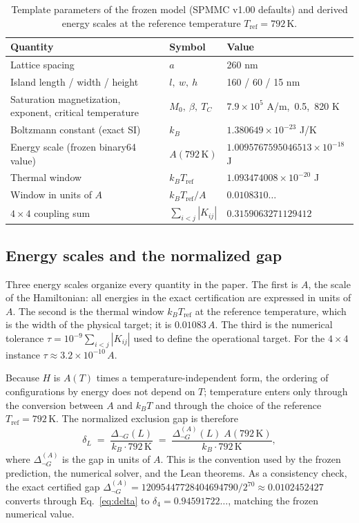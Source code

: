 \documentclass[11pt,a4paper]{article}
\theoremstyle{plain}
\theoremstyle{definition}
\theoremstyle{remark}
\newcommand{\dnG}{\Delta_{\neg G}}
\newcommand{\kBT}{k_{B}T}
\begin{document}
\begin{table}[t]
\centering\small
\caption{Template parameters of the frozen model (SPMMC v1.00 defaults) and derived energy scales at the reference temperature $T_{\mathrm{ref}}=792\,$K.}
\label{tab:params}
\begin{tabular}{@{}lll@{}}
\toprule
Quantity & Symbol & Value\\
\midrule
Lattice spacing & $a$ & 260 nm\\
Island length / width / height & $l,\ w,\ h$ & 160 / 60 / 15 nm\\
Saturation magnetization, exponent, critical temperature & $M_0,\ \beta,\ T_C$ & $7.9\times10^{5}$ A/m,\ 0.5,\ 820 K\\
Boltzmann constant (exact SI) & $k_B$ & $1.380649\times10^{-23}$ J/K\\
Energy scale (frozen binary64 value) & $A(792\,\mathrm K)$ & $1.0095767595046513\times10^{-18}$ J\\
Thermal window & $k_BT_{\mathrm{ref}}$ & $1.093474008\times10^{-20}$ J\\
Window in units of $A$ & $k_BT_{\mathrm{ref}}/A$ & $0.0108310\ldots$\\
$4\times4$ coupling sum & $\sum_{i<j}|K_{ij}|$ & $0.3159063271129412$\\
\bottomrule
\end{tabular}
\end{table}

\subsection{Energy scales and the normalized gap}
Three energy scales organize every quantity in the paper. The first is $A$, the scale of the Hamiltonian: all energies in the exact certification are expressed in units of $A$. The second is the thermal window $\kBT_{\mathrm{ref}}$ at the reference temperature, which is the width of the physical target; it is $0.01083\,A$. The third is the numerical tolerance $\tau=10^{-9}\sum_{i<j}|K_{ij}|$ used to define the operational target. For the $4\times4$ instance $\tau\approx3.2\times10^{-10}\,A$.

Because $H$ is $A(T)$ times a temperature-independent form, the ordering of configurations by energy does not depend on $T$; temperature enters only through the conversion between $A$ and $\kBT$ and through the choice of the reference $T_{\mathrm{ref}}=792\,$K. The normalized exclusion gap is therefore
\begin{equation}
\delta_L\;=\;\frac{\dnG(L)}{k_B\cdot 792\,\mathrm K}\;=\;\frac{\Delta^{(A)}_{\neg G}(L)\;A(792\,\mathrm K)}{k_B\cdot 792\,\mathrm K},
\label{eq:delta}
\end{equation}
where $\Delta^{(A)}_{\neg G}$ is the gap in units of $A$. This is the convention used by the frozen prediction, the numerical solver, and the Lean theorems. As a consistency check, the exact certified gap $\Delta^{(A)}_{\neg G}=12095447728404694790/2^{70}\approx0.0102452427$ converts through Eq.~\eqref{eq:delta} to $\delta_4=0.94591722\ldots$, matching the frozen numerical value.
\end{document}
